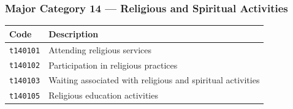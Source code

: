\documentclass[11pt, a4paper]{article}
\begin{document}
\subsubsection*{Major Category 14 --- Religious and Spiritual Activities}
\begin{longtable}{L{3cm} L{13cm}}
\toprule \textbf{Code} & \textbf{Description} \\ \midrule \endhead
\bottomrule \endfoot
\texttt{t140101} & Attending religious services \\
 \texttt{t140102} & Participation in religious practices \\
\texttt{t140103} & Waiting associated with religious and spiritual activities \\
 \texttt{t140105} & Religious education activities \\
\end{longtable}
\end{document}
